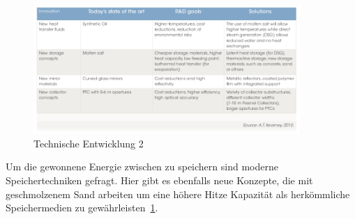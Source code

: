 \begin{figure}[H]
	\centering
	\includegraphics[width=0.9\textwidth,trim=1 1 1 1,clip]{technische_entwicklung2.png}
	\caption{Technische Entwicklung 2}
	\label{fig:technik_e2}
\end{figure}

Um die gewonnene Energie zwischen zu speichern sind moderne Speichertechniken gefragt. Hier gibt es ebenfalls neue Konzepte, die mit geschmolzenem Sand arbeiten um eine höhere Hitze Kapazität als herkömmliche Speichermedien zu gewährleisten~\ref{fig:technik_e2}.


